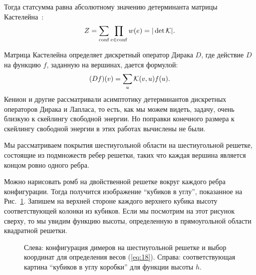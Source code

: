 \documentclass{article}
\begin{document}
Тогда статсумма равна абсолютному значению детерминанта матрицы Кастелейна~\cite{P.W-1961,doi:10.1080/14786436108243366}: 
\begin{equation}
  \label{eq:15}
  Z=\sum_{\mathrm{conf}}\prod_{e\in \mathrm{conf}}w(e)=|\det {\cal K}|.
\end{equation}

Матрица Кастелейна определяет дискретный оператор Дирака  $D$, где действие  $D$ на функцию $f$,
заданную на вершинах, дается формулой:
\begin{equation}
  \label{eq:16}
  (Df)(v)=\sum_{u}{\cal K}(v,u) f(u).
\end{equation}
Кенион \cite{kenyon2002laplacian,kenyon2000asymptotic} и другие  \cite{sridhar2015asymptotic}
рассматривали асимптотику детерминантов дискретных операторов Дирака и Лапласа, то есть, как мы
можем видеть, задачу, очень близкую к скейлингу свободной энергии. Но поправки конечного размера к
скейлингу свободной энергии в этих работах вычислены не были.

Мы рассматриваем покрытия шестиугольной области на шестиугольной решетке, состоящие из подмножеств
ребер решетки, таких что каждая вершина является концом ровно одного ребра.

Можно нарисовать ромб на двойственной решетке вокруг каждого ребра конфигурации. Тогда получится
изображение ``кубиков в углу'', показанное на Рис.~\ref{dhf}. Запишем на верхней стороне каждого
верхнего кубика высоту соответствующей колонки из кубиков. Если мы посмотрим на этот рисунок сверху,
то мы увидим функцию высоты, определенную в прямоугольной области квадратной решетки. 
  


\begin{figure}[htbp]
\caption{\label{dhf}Слева: конфигурация димеров на шестиугольной решетке и выбор координат для
  определения весов  (\ref{eq:18}). Справа: соответствующая картина ``кубиков в углу коробки'' для
  функции высоты $h$.}
\end{figure}
\end{document}
